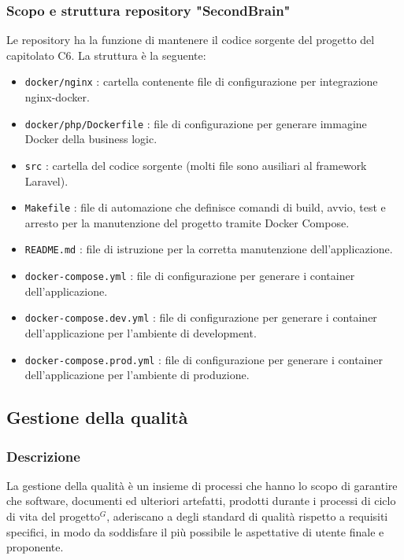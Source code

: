 \documentclass[a4paper,10pt]{article}
\begin{document}
\subsubsection{Scopo e struttura repository "SecondBrain"}
Le repository ha la funzione di mantenere il codice sorgente del progetto del capitolato C6.
La struttura è la seguente:
\begin{itemize}
  \item \texttt{docker/nginx} : cartella contenente file di configurazione per integrazione nginx-docker.
  \item \texttt{docker/php/Dockerfile} : file di configurazione per generare immagine Docker della business logic.
  \item \texttt{src} : cartella del codice sorgente (molti file sono ausiliari al framework Laravel).
  \item \texttt{Makefile} : file di automazione che definisce comandi di build, avvio, test e arresto per la manutenzione del progetto tramite Docker Compose.
  \item \texttt{README.md} : file di istruzione per la corretta manutenzione dell'applicazione.
  \item \texttt{docker-compose.yml} : file di configurazione per generare i container dell'applicazione.
  \item \texttt{docker-compose.dev.yml} : file di configurazione per generare i container dell'applicazione per l'ambiente di development.
  \item \texttt{docker-compose.prod.yml} : file di configurazione per generare i container dell'applicazione per l'ambiente di produzione.
\end{itemize}

\subsection{Gestione della qualità}
\subsubsection{Descrizione}
La gestione della qualità è un insieme di processi che hanno lo scopo di garantire che software, documenti ed ulteriori artefatti, prodotti durante
i processi di ciclo di vita del progetto$^G$, aderiscano a degli standard di qualità rispetto a requisiti specifici, in modo da soddisfare il più possibile 
le aspettative di utente finale e proponente.
\end{document}
